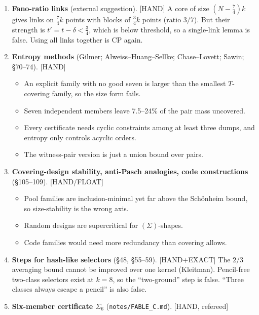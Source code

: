 \documentclass[11pt]{article}
\newcommand{\lvl}[1]{\textsf{\small[#1]}}
\begin{document}
\begin{enumerate}[leftmargin=*,label=\textbf{\arabic*.}]
\begin{itemize}
 \item Traces lower $\omega$ only on paper, and exclusions cannot be forced.
 \item \emph{Theorem 102.1}: a static certificate's budget $(q-3)\delta+(7-q)\varepsilon$ depends only on $(N,t,q)$.
 \end{itemize}
\item \textbf{Fano-ratio links} (external suggestion). \lvl{HAND} A core of size $(N-\tfrac74)k$ gives links on
$\tfrac74k$ points with blocks of $\tfrac34k$ points (ratio $3/7$). But their strength is $t'=t-\delta<\tfrac34$, which
is below threshold, so a single-link lemma is false. Using all links together is CP again.
\item \textbf{Entropy methods} (Gilmer; Alweiss--Huang--Sellke; Chase--Lovett; Sawin; \S70--74). \lvl{HAND}
 \begin{itemize}
 \item An explicit family with no good seven is larger than the smallest $T$-covering family, so the size form fails.
 \item Seven independent members leave 7.5--24\% of the pair mass uncovered.
 \item Every certificate needs cyclic constraints among at least three dumps, and entropy only controls acyclic orders.
 \item The witness-pair version is just a union bound over pairs.
 \end{itemize}
\item \textbf{Covering-design stability, anti-Pasch analogies, code constructions} (\S105--109). \lvl{HAND/FLOAT}
 \begin{itemize}
 \item Pool families are inclusion-minimal yet far above the Schönheim bound, so size-stability is the wrong axis.
 \item Random designs are supercritical for $(\Sigma)$-shapes.
 \item Code families would need more redundancy than covering allows.
 \end{itemize}
\item \textbf{Steps for hash-like selectors} (\S48, \S55--59). \lvl{HAND+EXACT} The $2/3$ averaging bound cannot be
improved over one kernel (Kleitman). Pencil-free two-class selectors exist at $k=8$, so the ``two-ground'' step is
false. ``Three classes always escape a pencil'' is also false.
\item \textbf{Six-member certificate $\Sigma_6$} (\texttt{notes/FABLE\_C.md}). \lvl{HAND, refereed}

\end{enumerate}
\end{document}
